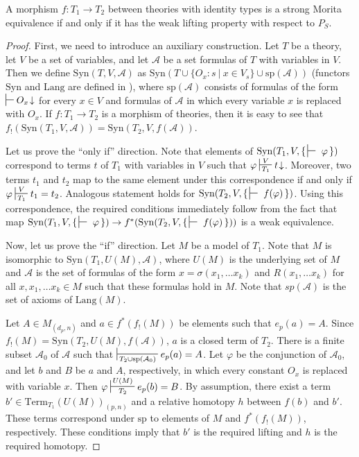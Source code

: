 \documentclass[reqno]{amsart}
\theoremstyle{definition}
\theoremstyle{remark}
\newcommand{\Syn}{\mathrm{Syn}}
\newcommand{\Lang}{\mathrm{Lang}}
\newcommand{\Term}{\mathrm{Term}}
\numberwithin{figure}{section}
\begin{document}
\begin{prop}
A morphism $f : T_1 \to T_2$ between theories with identity types is a strong Morita equivalence if and only if it has the weak lifting property with respect to $P_S$.
\end{prop}
\begin{proof}
First, we need to introduce an auxiliary construction.
Let $T$ be a theory, let $V$ be a set of variables, and let $\mathcal{A}$ be a set formulas of $T$ with variables in $V$.
Then we define $\Syn(T,V,\mathcal{A})$ as $\Syn(T \cup \{ O_x : s\ |\ x \in V_s \} \cup \mathrm{sp}(\mathcal{A}))$ (functors $\Syn$ and $\Lang$ are defined in \cite{alg-models}),
where $\mathrm{sp}(\mathcal{A})$ consists of formulas of the form $\sststile{}{} O_x\!\downarrow$ for every $x \in V$
and formulas of $\mathcal{A}$ in which every variable $x$ is replaced with $O_x$.
If $f : T_1 \to T_2$ is a morphism of theories, then it is easy to see that $f_!(\Syn(T_1,V,\mathcal{A})) = \Syn(T_2,V,f(\mathcal{A}))$.

Let us prove the ``only if'' direction.
Note that elements of $\Syn(T_1, V, \{\,\sststile{}{}~\varphi\,\})$ correspond to terms $t$ of $T_1$ with variables in $V$ such that $\varphi \sststile{T_1}{V} t\!\downarrow$.
Moreover, two terms $t_1$ and $t_2$ map to the same element under this correspondence if and only if $\varphi \sststile{T_1}{V} t_1 = t_2$.
Analogous statement holds for $\Syn(T_2, V, \{\,\sststile{}{}~f(\varphi)\,\})$.
Using this correspondence, the required conditions immediately follow from the fact that
map $\Syn(T_1, V, \{\,\sststile{}{}~\varphi\,\}) \to f^*(\Syn(T_2, V, \{\,\sststile{}{}~f(\varphi)\,\}))$ is a weak equivalence.

Now, let us prove the ``if'' direction.
Let $M$ be a model of $T_1$.
Note that $M$ is isomorphic to $\Syn(T_1, U(M), \mathcal{A})$, where $U(M)$ is the underlying set of $M$ and $\mathcal{A}$ is the set of formulas of the form
$x = \sigma(x_1, \ldots x_k)$ and $R(x_1, \ldots x_k)$ for all $x, x_1, \ldots x_k \in M$ such that these formulas hold in $M$.
Note that $sp(\mathcal{A})$ is the set of axioms of $\Lang(M)$.

Let $A \in M_{(d_p,n)}$ and $a \in f^*(f_!(M))$ be elements such that $e_p(a) = A$.
Since $f_!(M) = \Syn(T_2, U(M), f(\mathcal{A}))$, $a$ is a closed term of $T_2$.
There is a finite subset $\mathcal{A}_0$ of $\mathcal{A}$ such that $\sststile{T_2 \cup \mathrm{sp}(\mathcal{A}_0)}{} e_p(a) = A$.
Let $\varphi$ be the conjunction of $\mathcal{A}_0$, and let $b$ and $B$ be $a$ and $A$, respectively, in which every constant $O_x$ is replaced with variable $x$.
Then $\varphi \sststile{T_2}{U(M)} e_p(b) = B$.
By assumption, there exist a term $b' \in \Term_{T_1}(U(M))_{(p,n)}$ and a relative homotopy $h$ between $f(b)$ and $b'$.
These terms correspond under $\mathrm{sp}$ to elements of $M$ and $f^*(f_!(M))$, respectively.
These conditions imply that $b'$ is the required lifting and $h$ is the required homotopy.
\end{proof}
\end{document}
